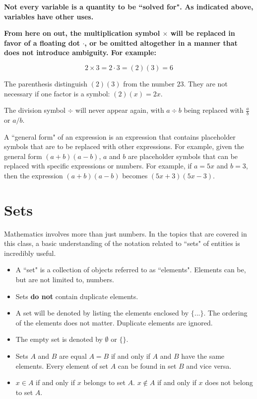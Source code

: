 \documentclass{article}
\begin{document}
{\bf Not every variable is a quantity to be ``solved for". As indicated above, variables have other uses.}

{\bf From here on out, the multiplication symbol \(\times\) will be replaced in favor of a floating dot \(\cdot\), or be omitted altogether in a manner that does not introduce ambiguity. For example:}

\[2 \times 3  = 2 \cdot 3 = (2)(3) = 6\]

The parenthesis distinguish \((2)(3)\) from the number \(23\). They are not necessary if one factor is a symbol: \((2)(x) = 2x\). 

The division symbol \(\div\) will never appear again, with \(a \div b\) being replaced with \(\frac{a}{b}\) or \(a/b\).

A ``general form" of an expression is an expression that contains placeholder symbols that are to be replaced with other expressions. For example, given the general form \((a + b)(a - b)\), \(a\) and \(b\) are placeholder symbols that can be replaced with specific expressions or numbers. For example, if \(a = 5x\) and \(b = 3\), then the expression \((a + b)(a - b)\) becomes \((5x + 3)(5x - 3)\).





\section{Sets}

Mathematics involves more than just numbers. In the topics that are covered in this class, a basic understanding of the notation related to ``sets" of entities is incredibly useful.  

\begin{itemize}
\item A ``set" is a collection of objects referred to as ``elements". Elements can be, but are not limited to, numbers.
\item Sets {\bf do not} contain duplicate elements.
\item A set will be denoted by listing the elements enclosed by \(\{...\}\). The ordering of the elements does not matter. Duplicate elements are ignored.
\item The empty set is denoted by \(\emptyset\) or \(\{\}\).
\item Sets \(A\) and \(B\) are equal \(A = B\) if and only if \(A\) and \(B\) have the same elements. Every element of set \(A\) can be found in set \(B\) and vice versa.
\item \(x \in A\) if and only if \(x\) belongs to set \(A\). \(x \notin A\) if and only if \(x\) does not belong to set \(A\).
\end{itemize}
\end{document}
